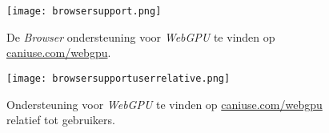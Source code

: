 \begin{figure}
    \texttt{[image: browsersupport.png]}
    \caption[Ondersteuning voor \textit{WebGPU} \autocite{Deveria2024}]{
        De \textit{Browser} ondersteuning voor \textit{WebGPU} te vinden op \href{https://caniuse.com/webgpu}{caniuse.com/webgpu}. \autocite{Deveria2024}
    }
    \label{fig:Browser Support}
\end{figure}

\begin{figure}
    \texttt{[image: browsersupportuserrelative.png]}
    \caption[\textit{Browser} ondersteuning voor \textit{WebGPU} relatief tot gebruikers \autocite{Deveria2024}]{
        Ondersteuning voor \textit{WebGPU} te vinden op \href{https://caniuse.com/webgpu}{caniuse.com/webgpu} relatief tot gebruikers. \autocite{Deveria2024}
    }
    \label{fig:Relative Browser Support}
\end{figure}